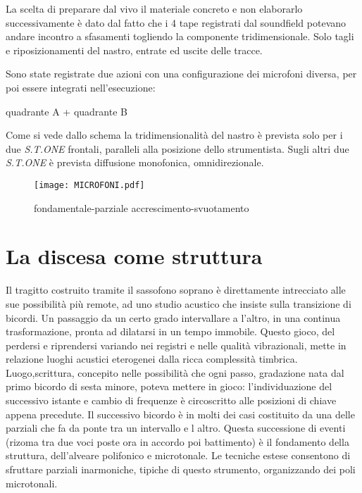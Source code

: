 La scelta di preparare  dal vivo il materiale  concreto e non elaborarlo successivamente
è dato dal fatto che i 4 tape registrati dal soundfield potevano andare incontro a
sfasamenti togliendo la componente tridimensionale. Solo tagli e riposizionamenti
del nastro, entrate ed uscite delle tracce.

Sono state registrate due azioni con una configurazione dei microfoni diversa,
per poi essere integrati nell'esecuzione:

\begin{center}
quadrante A + quadrante B
\end{center}

Come si vede dallo schema la tridimensionalità del nastro è prevista solo per i due
\emph{S.T.ONE} frontali, paralleli alla posizione dello strumentista. Sugli altri due
\emph{S.T.ONE} è prevista diffusione monofonica, omnidirezionale.

\begin{figure}[h]
\centering
{\texttt{[image: MICROFONI.pdf]}}
\caption[Passaggio microtonale]{fondamentale-parziale accrescimento-svuotamento}
\label{fig:microtoni}
\end{figure}

\section{La discesa come struttura}

Il tragitto costruito tramite il sassofono soprano è direttamente intrecciato alle sue
possibilità più remote, ad uno studio acustico che insiste sulla transizione di bicordi.
Un passaggio da un certo grado intervallare a l’altro, in una continua trasformazione,
pronta ad dilatarsi in un tempo immobile. Questo gioco, del perdersi e riprendersi
variando nei registri e nelle  qualità vibrazionali, mette in relazione luoghi
acustici eterogenei dalla ricca complessità timbrica.
Luogo,scrittura, concepito nelle possibilità che ogni passo, gradazione nata dal
primo bicordo di sesta minore, poteva mettere in gioco: l’individuazione del successivo
istante e cambio di frequenze è circoscritto alle posizioni di chiave appena precedute.
Il successivo bicordo è in molti dei casi costituito da una delle parziali che fa da
ponte tra un intervallo e l altro.
Questa successione di eventi (rizoma tra due voci poste ora in accordo poi battimento)
è il fondamento della struttura, dell’alveare polifonico e microtonale.
Le tecniche estese consentono di sfruttare parziali inarmoniche, tipiche di questo
strumento, organizzando dei poli microtonali.

